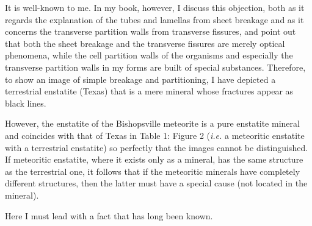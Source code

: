 \documentclass[a4paper, 12pt, oneside]{article}
\begin{document}
It is well-known to me. In my book, however, I discuss this objection, both as it regards the explanation of the tubes and lamellas from sheet breakage and as it concerns the transverse partition walls from transverse fissures, and point out that both the sheet breakage and the transverse fissures are merely optical phenomena, while the cell partition walls of the organisms and especially the transverse partition walls in my forms are built of special substances. Therefore, to show an image of simple breakage and partitioning, I have depicted a terrestrial enstatite (Texas) that is a mere mineral whose fractures appear as black lines.

However, the enstatite of the Bishopsville meteorite is a pure enstatite mineral and coincides with that of Texas in Table 1: Figure 2 (\emph{i.e.} a meteoritic enstatite with a terrestrial enstatite) so perfectly that the images cannot be distinguished. If meteoritic enstatite, where it exists only as a mineral, has the same structure as the terrestrial one, it follows that if the meteoritic minerals have completely different structures, then the latter must have a special cause (not located in the mineral).

Here I must lead with a fact that has long been known.
\end{document}
